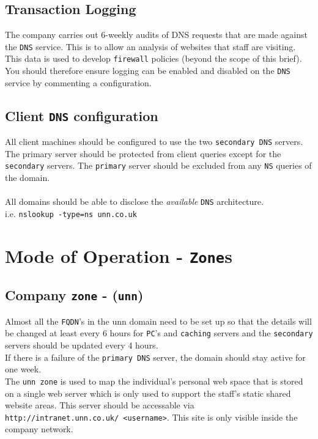\documentclass[11pt]{article}
\begin{document}
\subsection{Transaction Logging}
The company carries out 6-weekly audits of DNS requests that are made against the \texttt{DNS} service. This is to allow an analysis of websites that staff are 
visiting. This data is used to develop \texttt{firewall} policies (beyond the scope of this brief). You should therefore ensure logging can be enabled and 
disabled on the \texttt{DNS} service by commenting a configuration. 

\subsection{Client \texttt{DNS} configuration}
All client machines should be configured to use the two \texttt{secondary DNS} servers. The primary server should be protected from client queries except for 
the \texttt{secondary} servers. The \texttt{primary} server should be excluded from any \texttt{NS} queries of the domain.\\\\

\noindent All domains should be able to disclose the \textit{available} \texttt{DNS} architecture.\\ 
i.e. \texttt{nslookup -type=ns unn.co.uk}

\section{Mode of Operation - \texttt{Zone}s}

\subsection{Company \texttt{zone} - (\texttt{unn})}
Almost all the \texttt{FQDN}’s in the unn domain need to be set up so that the details will be changed at least every 6 hours for \texttt{PC}’s and 
\texttt{caching} servers and the \texttt{secondary} servers should be updated every 4 hours.\\ 
If there is a failure of the \texttt{primary DNS} server, the domain should stay active for one week.\\

\noindent The \texttt{unn zone} is used to map the individual’s personal web space that is stored on a single web server which is only used to support 
the staff’s static shared website areas. This server should be accessable via \texttt{http://intranet.unn.co.uk/~<username>}. This site is only visible 
inside the company network.\\
\end{document}
